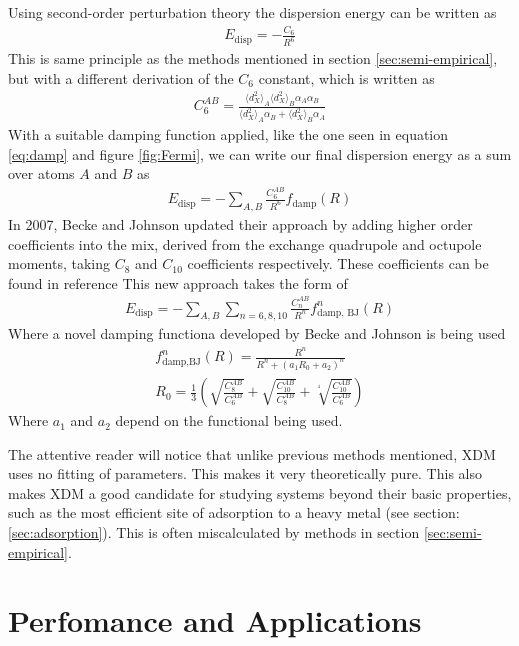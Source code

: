 \documentclass[10pt,a4paper,twocolumn,twoside]{extarticle}
\begin{document}
	Using second-order perturbation theory\cite{XDM-dipole} the dispersion energy can be written as 
	\begin{align}
		E_\text{disp} = -\frac{C_6}{R^6}
	\end{align}
	This is same principle as the methods mentioned in section \ref{sec:semi-empirical}, but with a different derivation of the $C_6$ constant, which is written as
	\begin{align}
		C_6^{AB} = \frac{\langle d_X^2 \rangle_A \langle d_X^2 \rangle_B \alpha_A \alpha_B}{\langle d_X^2 \rangle_A\alpha_B + \langle d_X^2 \rangle_B\alpha_A}
	\end{align} 
	With a suitable damping function applied, like the one seen in equation \ref{eq:damp} and figure \ref{fig:Fermi}, we can write our final dispersion energy as a sum over atoms $A$ and $B$ as 
	\begin{align}
		E_\text{disp} = - \sum_{A,B} \frac{C_6^{AB}}{R^6} f_\text{damp}(R)
	\end{align}
	In 2007, Becke and Johnson updated their approach\cite{XDM-Revisited} by adding higher order coefficients into the mix, derived from the exchange quadrupole and octupole moments, taking $C_8$ and $C_{10}$ coefficients respectively. These coefficients can be found in reference \cite{XDM-Revisited} This new approach takes the form of 
	\begin{align}
		E_\text{disp} = -\sum_{A,B} \sum_{n=6,8,10} \frac{C_n^{AB}}{R^n} f^n_\text{damp, BJ}(R)
	\end{align}
	Where a novel damping functiona developed by Becke and Johnson is being used \cite{BJ-Damp}
	\begin{align}
		\label{eq:BJ-Damp}
		f^n_\text{damp,BJ} (R) = \frac{R^n}{R^n + (a_1 R_0 + a_2)^n}\\
		R_0 = \frac{1}{3} \left( \sqrt{\frac{C_8^{AB}}{C_6^{AB}}} + \sqrt{\frac{C_{10}^{AB}}{C_8^{AB}}}
		+ \sqrt[^4]{\frac{C_{10}^{AB}}{C_6^{AB}}} \right)
	\end{align}
	Where $a_1$ and $a_2$ depend on the functional being used.
	
	The attentive reader will notice that unlike previous methods mentioned, XDM uses no fitting of parameters. This makes it very theoretically pure. This also makes XDM a good candidate for studying systems beyond their basic properties, such as the most efficient site of adsorption to a heavy metal (see section:\ref{sec:adsorption}). This is often miscalculated by methods in section \ref{sec:semi-empirical}.

	\section{Perfomance and Applications}
\end{document}
